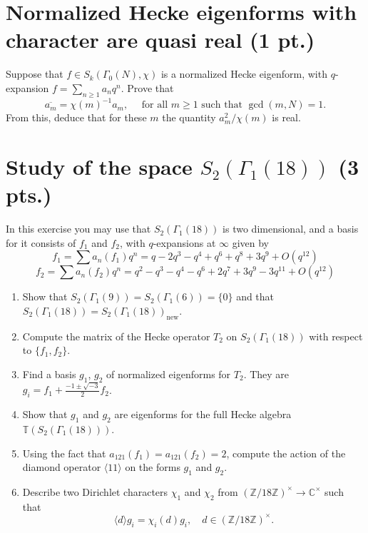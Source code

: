 \documentclass[paper=a4, fontsize=11pt]{scrartcl} %
\numberwithin{equation}{section} %
\numberwithin{figure}{section} %
\numberwithin{table}{section} %
\newcommand{\bbC}{\mathbb{C}}
\newcommand{\bbZ}{\mathbb{Z}}
\newcommand{\bbT}{\mathbb{T}}
\newcommand{\CC}{\bbC}
\newcommand{\ZZ}{\bbZ}
\begin{document}
\section{Normalized Hecke eigenforms with character are quasi real (1 pt.)}
Suppose that $f\in S_k(\Gamma_0(N),\chi)$ is a normalized Hecke eigenform, with $q$-expansion $f=\sum_{n\geq 1} a_nq^n$. Prove that
\[
\overline{a_m} = \chi(m)^{-1}a_m,\quad \text{ for all } m\geq 1 \text{ such that } \gcd(m,N)=1.
\]
From this, deduce that for these $m$ the quantity $a_m^2/\chi(m)$ is real.
\section{Study of the space $S_2(\Gamma_1(18))$ (3 pts.)}
In this exercise you may use that $S_2(\Gamma_1(18))$ is two dimensional, and a basis for it consists of $f_1$ and $f_2$, with $q$-expansions at $\infty$ given by
\[
f_1=\sum a_n(f_1)q^n = q - 2q^{3} - q^{4} + q^{6} + q^{8} + 3q^{9} + O(q^{12})
\]
\[
f_2=\sum a_n(f_2)q^n = q^{2} - q^{3} - q^{4} - q^{6} + 2q^{7} + 3q^{9} -3q^{11}+ O(q^{12})
\]
\begin{enumerate}
\item Show that $S_2(\Gamma_1(9))=S_2(\Gamma_1(6))=\{0\}$ and that $S_2(\Gamma_1(18))=S_2(\Gamma_1(18))_{\text{new}}$.
\item Compute the matrix of the Hecke operator $T_2$ on $S_2(\Gamma_1(18))$ with respect to $\{f_1,f_2\}$.


\item Find a basis $g_1$, $g_2$ of normalized eigenforms for $T_2$.
They are $g_i  = f_1 +\frac{-1\pm \sqrt{-3}}{2} f_2$.
\item Show that $g_1$ and $g_2$ are eigenforms for the full Hecke algebra $\bbT(S_2(\Gamma_1(18)))$.
\item Using the fact that $a_{121}(f_1) = a_{121}(f_2) = 2$, compute the action of the diamond operator $\langle 11\rangle$ on the forms $g_1$ and $g_2$.
\item Describe two Dirichlet characters $\chi_1$ and $\chi_2$ from $(\ZZ/18\ZZ)^\times\to\CC^\times$ such that
\[
\langle d\rangle g_i = \chi_i(d) g_i,\quad d\in (\ZZ/18\ZZ)^\times.
\]
\end{enumerate}
\end{document}
